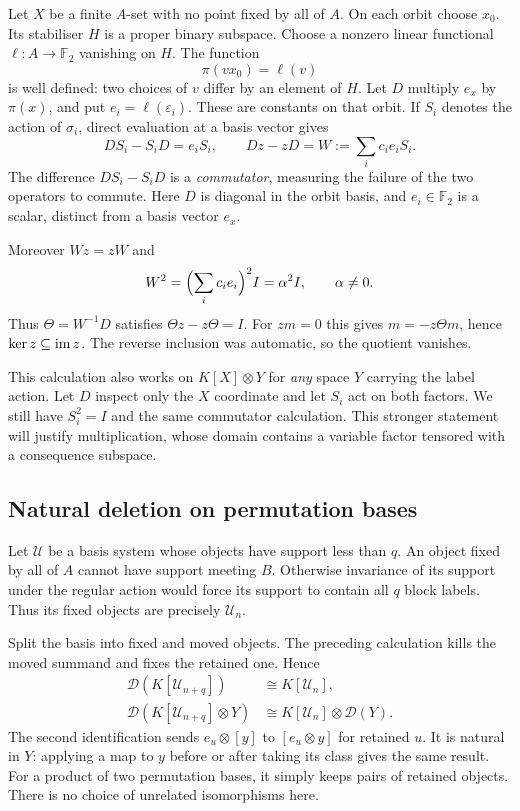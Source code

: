 \documentclass[11pt,a4paper]{article}
\theoremstyle{definition}\newtheorem{definition}[theorem]{Definition}
\theoremstyle{remark}\newtheorem{remark}[theorem]{Remark}
\newcommand{\Ftwo}{\mathbb F_2}
\newcommand{\D}{\mathcal D}\newcommand{\Del}{\mathcal D}\newcommand{\Lift}{\mathsf L}
\begin{document}
Let $X$ be a finite $A$-set with no point fixed by all of $A$. On each orbit choose $x_0$. Its stabiliser $H$ is a proper binary subspace. Choose a nonzero linear functional $\ell:A\to\Ftwo$ vanishing on $H$. The function
\[\pi(vx_0)=\ell(v)\]
is well defined: two choices of $v$ differ by an element of $H$. Let $D$ multiply $e_x$ by $\pi(x)$, and put $e_i=\ell(\varepsilon_i)$. These are constants on that orbit. If $S_i$ denotes the action of $\sigma_i$, direct evaluation at a basis vector gives
\[DS_i-S_iD=e_iS_i,\qquad Dz-zD=W:=\sum_i c_ie_iS_i.\]
The difference $DS_i-S_iD$ is a \emph{commutator}, measuring the
failure of the two operators to commute. Here $D$ is diagonal in the
orbit basis, and $e_i\in\Ftwo$ is a scalar, distinct from a basis
vector $e_x$.

Moreover $Wz=zW$ and
\[W^2=\Bigl(\sum_i c_ie_i\Bigr)^2I=\alpha^2I,\qquad\alpha\ne0.\]
Thus $\Theta=W^{-1}D$ satisfies $\Theta z-z\Theta=I$. For $zm=0$ this gives $m=-z\Theta m$, hence $\ker z\subseteq\operatorname{im} z$. The reverse inclusion was automatic, so the quotient vanishes.

This calculation also works on $K[X]\otimes Y$ for \emph{any} space $Y$ carrying the label action. Let $D$ inspect only the $X$ coordinate and let $S_i$ act on both factors. We still have $S_i^2=I$ and the same commutator calculation. This stronger statement will justify multiplication, whose domain contains a variable factor tensored with a consequence subspace.

\subsection{Natural deletion on permutation bases}
Let $\mathcal U$ be a basis system whose objects have support less than $q$. An object fixed by all of $A$ cannot have support meeting $B$. Otherwise invariance of its support under the regular action would force its support to contain all $q$ block labels. Thus its fixed objects are precisely $\mathcal U_n$.

Split the basis into fixed and moved objects. The preceding calculation kills the moved summand and fixes the retained one. Hence
\begin{align}
\D(K[\mathcal U_{n+q}])&\cong K[\mathcal U_n],\label{eq:basis}\\
\D(K[\mathcal U_{n+q}]\otimes Y)&\cong K[\mathcal U_n]\otimes\D(Y).\label{eq:tensor}
\end{align}
The second identification sends $e_u\otimes[y]$ to $[e_u\otimes y]$ for retained $u$. It is natural in $Y$: applying a map to $y$ before or after taking its class gives the same result. For a product of two permutation bases, it simply keeps pairs of retained objects. There is no choice of unrelated isomorphisms here.
\end{document}
